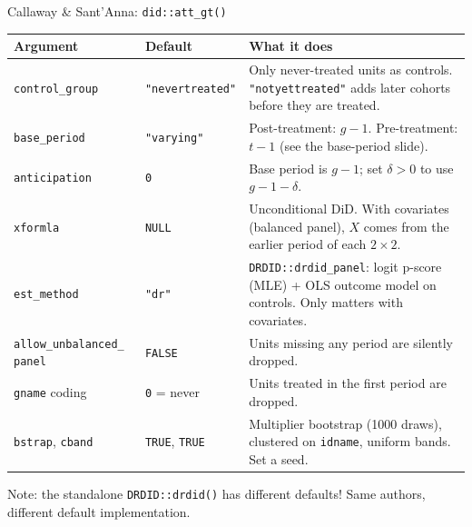\documentclass[11pt]{beamer}
\begin{document}
\begin{frame}[fragile]{Callaway \& Sant'Anna: \texttt{did::att\_gt()}}
\scriptsize
\setlength{\tabcolsep}{3pt}
\begin{tabular}{L{2.9cm} L{2.5cm} L{6cm}}
\toprule
Argument & Default & What it does \\
\midrule
\verb|control_group| & \verb|"nevertreated"| & Only never-treated units as controls. \verb|"notyettreated"| adds later cohorts before they are treated. \\
\verb|base_period| & \verb|"varying"| & Post-treatment: $g-1$. Pre-treatment: $t-1$ (see the base-period slide). \\
\verb|anticipation| & \verb|0| & Base period is $g-1$; set $\delta>0$ to use $g-1-\delta$. \\
\verb|xformla| & \verb|NULL| & Unconditional DiD. With covariates (balanced panel), $X$ comes from the earlier period of each $2\times2$. \\
\verb|est_method| & \verb|"dr"| & \verb|DRDID::drdid_panel|: logit p-score (MLE) + OLS outcome model on controls. Only matters with covariates. \\
\verb|allow_unbalanced_|\newline\verb|  panel| & \verb|FALSE| & Units missing any period are silently dropped. \\
\verb|gname| coding & \verb|0| = never & Units treated in the first period are dropped. \\
\verb|bstrap|, \verb|cband| & \verb|TRUE|, \verb|TRUE| & Multiplier bootstrap (1000 draws), clustered on \verb|idname|, uniform bands. Set a seed. \\
\bottomrule
\end{tabular}

\vspace{0.6em}
\footnotesize
Note: the standalone \verb|DRDID::drdid()| has different defaults! Same authors, different default implementation.
\end{frame}
\end{document}
